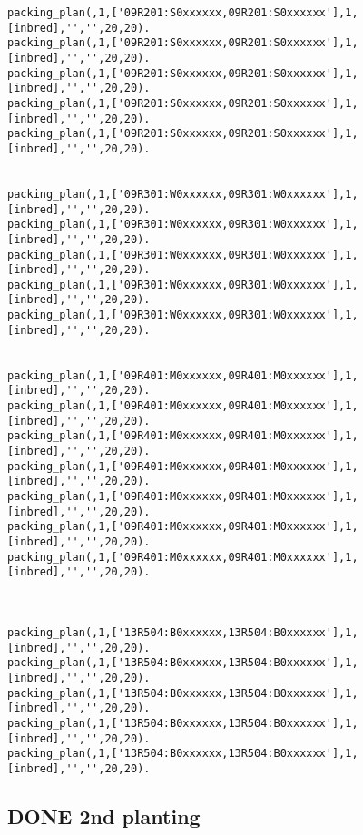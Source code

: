\documentclass[11pt]{article}
\begin{document}
\begin{verbatim}
packing_plan(,1,['09R201:S0xxxxxx,09R201:S0xxxxxx'],1,[inbred],'','',20,20).
packing_plan(,1,['09R201:S0xxxxxx,09R201:S0xxxxxx'],1,[inbred],'','',20,20).
packing_plan(,1,['09R201:S0xxxxxx,09R201:S0xxxxxx'],1,[inbred],'','',20,20).
packing_plan(,1,['09R201:S0xxxxxx,09R201:S0xxxxxx'],1,[inbred],'','',20,20).
packing_plan(,1,['09R201:S0xxxxxx,09R201:S0xxxxxx'],1,[inbred],'','',20,20).


packing_plan(,1,['09R301:W0xxxxxx,09R301:W0xxxxxx'],1,[inbred],'','',20,20).
packing_plan(,1,['09R301:W0xxxxxx,09R301:W0xxxxxx'],1,[inbred],'','',20,20).
packing_plan(,1,['09R301:W0xxxxxx,09R301:W0xxxxxx'],1,[inbred],'','',20,20).
packing_plan(,1,['09R301:W0xxxxxx,09R301:W0xxxxxx'],1,[inbred],'','',20,20).
packing_plan(,1,['09R301:W0xxxxxx,09R301:W0xxxxxx'],1,[inbred],'','',20,20).


packing_plan(,1,['09R401:M0xxxxxx,09R401:M0xxxxxx'],1,[inbred],'','',20,20).
packing_plan(,1,['09R401:M0xxxxxx,09R401:M0xxxxxx'],1,[inbred],'','',20,20).
packing_plan(,1,['09R401:M0xxxxxx,09R401:M0xxxxxx'],1,[inbred],'','',20,20).
packing_plan(,1,['09R401:M0xxxxxx,09R401:M0xxxxxx'],1,[inbred],'','',20,20).
packing_plan(,1,['09R401:M0xxxxxx,09R401:M0xxxxxx'],1,[inbred],'','',20,20).
packing_plan(,1,['09R401:M0xxxxxx,09R401:M0xxxxxx'],1,[inbred],'','',20,20).
packing_plan(,1,['09R401:M0xxxxxx,09R401:M0xxxxxx'],1,[inbred],'','',20,20).



packing_plan(,1,['13R504:B0xxxxxx,13R504:B0xxxxxx'],1,[inbred],'','',20,20).
packing_plan(,1,['13R504:B0xxxxxx,13R504:B0xxxxxx'],1,[inbred],'','',20,20).
packing_plan(,1,['13R504:B0xxxxxx,13R504:B0xxxxxx'],1,[inbred],'','',20,20).
packing_plan(,1,['13R504:B0xxxxxx,13R504:B0xxxxxx'],1,[inbred],'','',20,20).
packing_plan(,1,['13R504:B0xxxxxx,13R504:B0xxxxxx'],1,[inbred],'','',20,20).
\end{verbatim}


\subsection{{\bfseries\sffamily DONE} 2nd planting}
\label{sec-3-2}
\end{document}

